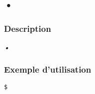 \subsection*{•}
\subsubsection*{Description}
\emph{•}

\subsubsection*{Exemple d'utilisation}

\begin{lstlisting}
$
\end{lstlisting}
